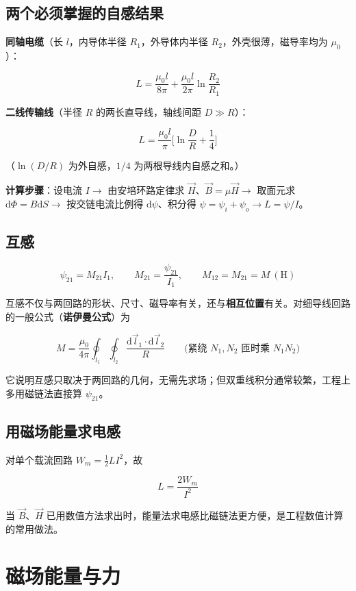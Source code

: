 \subsection{两个必须掌握的自感结果}
\textbf{同轴电缆}（长 $l$，内导体半径 $R_1$，外导体内半径 $R_2$，外壳很薄，磁导率均为 $\mu_0$）：
\begin{formulaBox}
\[
L=\frac{\mu_0 l}{8\pi}+\frac{\mu_0 l}{2\pi}\ln\frac{R_2}{R_1}
\]
\end{formulaBox}
\textbf{二线传输线}（半径 $R$ 的两长直导线，轴线间距 $D\gg R$）：
\begin{formulaBox}
\[
L=\frac{\mu_0 l}{\pi}\Big[\ln\frac{D}{R}+\frac14\Big]
\]
\end{formulaBox}
（$\ln(D/R)$ 为外自感，$1/4$ 为两根导线内自感之和。）

\textbf{计算步骤}：设电流 $I\to$ 由安培环路定律求 $\vec{H}$、$\vec{B}=\mu\vec{H}\to$ 取面元求 $\mathrm{d}\Phi=B\mathrm{d}S\to$ 按交链电流比例得 $\mathrm{d}\psi$、积分得 $\psi=\psi_i+\psi_o\to L=\psi/I$。

\subsection{互感}
\begin{formulaBox}
\[
\psi_{21}=M_{21}I_1,
\qquad
M_{21}=\frac{\psi_{21}}{I_1},
\qquad
M_{12}=M_{21}=M\ (\mathrm{H})
\]
\end{formulaBox}
互感不仅与两回路的形状、尺寸、磁导率有关，还与\textbf{相互位置}有关。对细导线回路的一般公式（\textbf{诺伊曼公式}）为
\begin{formulaBox}
\[
M=\frac{\mu_0}{4\pi}\oint_{l_1}\oint_{l_2}\frac{\mathrm{d}\vec{l}_1\cdot\mathrm{d}\vec{l}_2}{R}
\qquad
\Big(\text{紧绕 }N_1,N_2\text{ 匝时乘 }N_1N_2\Big)
\]
\end{formulaBox}
它说明互感只取决于两回路的几何，无需先求场；但双重线积分通常较繁，工程上多用磁链法直接算 $\psi_{21}$。

\subsection{用磁场能量求电感}
对单个载流回路 $W_m=\frac12 LI^2$，故
\begin{formulaBox}
\[
L=\frac{2W_m}{I^2}
\]
\end{formulaBox}
当 $\vec{B}$、$\vec{H}$ 已用数值方法求出时，能量法求电感比磁链法更方便，是工程数值计算的常用做法。

\section{磁场能量与力}

